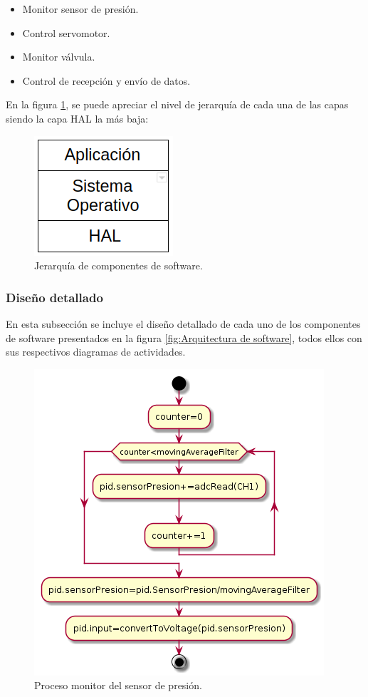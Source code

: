\begin{itemize}
\item Monitor sensor de presión.
\item Control servomotor.
\item Monitor válvula.
\item Control de recepción y envío de datos.
\end{itemize}

En la figura \ref{fig:Capas de componentes de software}, se puede apreciar el nivel de jerarquía de cada una de las capas siendo la capa HAL la  más baja: 

\begin{figure}[htpb]
\centering
\includegraphics[scale=.65]{./Figures/JerarquiaDeCapas-Software.png}
\caption{Jerarquía de componentes de software.}
\label{fig:Capas de componentes de software}
\end{figure}

\subsubsection{Diseño detallado}
En esta subsección se incluye el diseño detallado de cada uno de los componentes de software presentados en la figura \ref{fig:Arquitectura de software}, todos ellos con sus respectivos diagramas de actividades. 

	\begin{figure}[htpb]
	\centering
	\includegraphics[scale=.60]{./Figures/Procesomonitorsensordepresion.png}
	\caption{Proceso monitor del sensor de presión.}
	\label{fig:Control servomotor}
	\end{figure}
	
